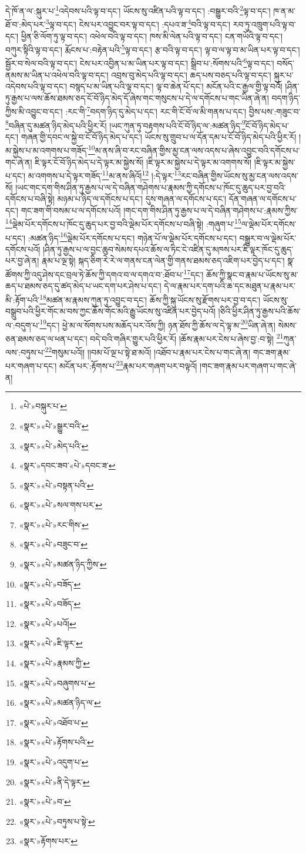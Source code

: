 དེ་ཁོ་ན་ལ་:སྐུར་པ་\footnote{«པེ་»བསྐུར་པ་}འདེབས་པའི་ལྟ་བ་དང་། ཡོངས་སུ་འཛིན་པའི་ལྟ་བ་དང་། :བསྒྱུར་བའི་\footnote{«སྣར་»«པེ་»སྒྱུར་བའི་}ལྟ་བ་དང་། ཁ་ན་མ་ཐོ་བ་:མེད་པར་\footnote{«སྣར་»«པེ་»མེད་པའི་}ལྟ་བ་དང་། ངེས་པར་འབྱུང་བར་ལྟ་བ་དང་། :དཔའ་ཟ་\footnote{«སྣར་»དབང་ཟབ་«པེ་»དབང་ཟ་}བའི་ལྟ་བ་དང་། རབ་ཏུ་འཁྲུག་པའི་ལྟ་བ་དང་། ཕྱིན་ཅི་ལོག་ཏུ་ལྟ་བ་དང་། འཕེལ་བའི་ལྟ་བ་དང་། ཁས་མི་ལེན་པའི་ལྟ་བ་དང་། ངན་གཡོའི་ལྟ་བ་དང་། བཀུར་སྟིའི་ལྟ་བ་དང་། རྨོངས་པ་:བརྟེན་པའི་\footnote{«སྣར་»«པེ་»བསྟན་པའི་}ལྟ་བ་དང་། རྩ་བའི་ལྟ་བ་དང་། ལྟ་བ་ལ་ལྟ་བ་མ་ཡིན་པར་ལྟ་བ་དང་། སྦྱོར་བ་སེལ་བའི་ལྟ་བ་དང་། ངེས་པར་འབྱིན་པ་མ་ཡིན་པར་ལྟ་བ་དང་། སྒྲིབ་པ་:སོགས་པའི་\footnote{«སྣར་»«པེ་»སལ་གས་པར་}ལྟ་བ་དང་། བསོད་ནམས་མ་ཡིན་པ་འཕེལ་བའི་ལྟ་བ་དང་། འབྲས་བུ་མེད་པའི་ལྟ་བ་དང་། ཆད་པས་བཅད་པའི་ལྟ་བ་དང་། སྐུར་པ་འདེབས་པའི་ལྟ་བ་དང་། བསྙད་པ་མ་ཡིན་པའི་ལྟ་བ་དང་། ལྟ་བ་ཆེན་པོ་དང་། མངོན་པའི་ང་རྒྱལ་གྱི་ལྟ་བའོ། །ཤིན་ཏུ་རྒྱས་པ་ལས་ཆོས་ཐམས་ཅད་ངོ་བོ་ཉིད་མེད་དོ་ཞེས་གང་གསུངས་པ་དེ་ལ་དགོངས་པ་གང་ཡིན་ཞེ་ན། བདག་ཉིད་ཀྱིས་མི་འབྱུང་བ་དང་། :རང་གི་\footnote{«སྣར་»«པེ་»རང་གིས་}བདག་ཉིད་དུ་མེད་པ་དང་། རང་གི་ངོ་བོ་ལ་མི་གནས་པ་དང་། བྱིས་པས་:གཟུང་བ་\footnote{«སྣར་»«པེ་»བཟུང་བ་}བཞིན་དུ་མཚན་ཉིད་མེད་པའི་ཕྱིར་རོ། །ཡང་ཀུན་ཏུ་བརྟགས་པའི་ངོ་བོ་ཉིད་ལ་:མཚན་ཉིད་\footnote{«སྣར་»«པེ་»མཚན་ཉིད་ཀྱིས་}ངོ་བོ་ཉིད་མེད་པ་དང་། གཞན་གྱི་དབང་ལ་སྐྱེ་བ་ངོ་བོ་ཉིད་མེད་པ་དང་། ཡོངས་སུ་གྲུབ་པ་ལ་དོན་དམ་པ་ངོ་བོ་ཉིད་མེད་པའི་ཕྱིར་རོ། །མ་སྐྱེས་པ་མ་འགགས་པ་གཟོད་\footnote{«སྣར་»«པེ་»བཟོད་}མ་ནས་ཞི་བ་རང་བཞིན་གྱིས་མྱ་ངན་ལས་འདས་པ་ཞེས་འབྱུང་བའི་དགོངས་པ་གང་ཞེ་ན། ཇི་ལྟར་ངོ་བོ་ཉིད་མེད་པ་དེ་ལྟར་མ་སྐྱེས་སོ། །ཇི་ལྟར་མ་སྐྱེས་པ་དེ་ལྟར་མ་འགགས་སོ། །ཇི་ལྟར་མ་སྐྱེས་པ་དང་། མ་འགགས་པ་དེ་ལྟར་གཟོད་\footnote{«སྣར་»«པེ་»བཟོད་}མ་ནས་ཞིའོ།\footnote{«སྣར་»«པེ་»པའོ།} །:དེ་ལྟར་\footnote{«སྣར་»«པེ་»ཇི་ལྟར་}རང་བཞིན་གྱིས་ཡོངས་སུ་མྱ་ངན་ལས་འདས་སོ། །ཡང་གང་དག་གིས་ཤིན་ཏུ་རྒྱས་པ་ལ་དེ་བཞིན་གཤེགས་པ་རྣམས་ཀྱི་དགོངས་པ་ཁོང་དུ་ཆུད་པར་བྱ་བའི་དགོངས་པ་བཞི་སྟེ། མཉམ་པ་ཉིད་ལ་དགོངས་པ་དང་། དུས་གཞན་ལ་དགོངས་པ་དང་། དོན་གཞན་ལ་དགོངས་པ་དང་། གང་ཟག་གི་བསམ་པ་ལ་དགོངས་པའོ། །གང་དག་གིས་ཤིན་ཏུ་རྒྱས་པ་ལ་དེ་བཞིན་གཤེགས་པ་:རྣམས་ཀྱིས་\footnote{«སྣར་»«པེ་»རྣམས་ཀྱི་}ལྡེམ་པོར་དགོངས་པ་ཁོང་དུ་ཆུད་པར་བྱ་བའི་ལྡེམ་པོར་དགོངས་པ་བཞི་སྟེ། :གཞུག་པ་\footnote{«སྣར་»«པེ་»བཞུགས་པ་}ལ་ལྡེམ་པོར་དགོངས་པ་དང་། :མཚན་ཉིད་\footnote{«སྣར་»«པེ་»མཚན་ཉིད་ལ་}ལྡེམ་པོར་དགོངས་པ་དང་། གཉེན་པོ་ལ་ལྡེམ་པོར་དགོངས་པ་དང་། བསྒྱུར་བ་ལ་ལྡེམ་པོར་དགོངས་པའོ། །ཤིན་ཏུ་རྒྱས་པ་ལ་བྱང་ཆུབ་སེམས་དཔའ་ཆོས་ལ་ཏིང་ངེ་འཛིན་དུ་མཁས་པར་ཇི་ལྟར་ཁོང་དུ་ཆུད་པར་བྱ་ཞེ་ན། རྣམ་པ་ལྔ་སྟེ། སྐད་ཅིག་རེ་རེ་ལ་གནས་ངན་ལེན་གྱི་གནས་ཐམས་ཅད་འཇིག་པར་བྱེད་པ་དང་། སྣ་ཚོགས་ཀྱི་འདུ་ཤེས་དང་བྲལ་ཏེ་ཆོས་ཀྱི་དགའ་བ་ལ་དགའ་བ་:ཐོབ་པ་\footnote{«སྣར་»«པེ་»འཐོབ་པ་}དང་། ཆོས་ཀྱི་སྣང་བ་རྣམ་པ་ཡོངས་སུ་མ་ཆད་པ་ཐམས་ཅད་དུ་ཚད་མེད་པ་ཡང་དག་པར་ཤེས་པ་དང་། དེ་ལ་རྣམ་པར་དག་པའི་ཆ་དང་མཐུན་པ་རྣམ་པར་མི་:རྟོག་པའི་\footnote{«སྣར་»«པེ་»རྟོགས་པའི་}མཚན་མ་རྣམས་ཀུན་ཏུ་འབྱུང་བ་དང་། ཆོས་ཀྱི་སྐུ་ཡོངས་སུ་རྫོགས་པར་བྱ་བ་དང་། ཡོངས་སུ་བསྒྲུབ་པའི་ཕྱིར་གོང་མ་བས་ཀྱང་ཆོས་གོང་མའི་རྒྱུ་ཡོངས་སུ་འཛིན་པར་བྱེད་པའོ། །ཅིའི་ཕྱིར་ཤིན་ཏུ་རྒྱས་པའི་ཆོས་ལ་:བདུག་པ་\footnote{«སྣར་»«པེ་»འདུག་པ་}དང་། ཕྱེ་མ་ལ་སོགས་པས་མཆོད་པར་འོས་ཀྱི། ཉན་ཐོས་ཀྱི་ཆོས་ལ་དེ་ལྟ་མ་\footnote{«སྣར་»«པེ་»ནི་དེ་ལྟར་}ཡིན་ཞེ་ན། སེམས་ཅན་ཐམས་ཅད་ལ་ཕན་པ་དང་། བདེ་བའི་གཞིར་གྱུར་པའི་ཕྱིར་རོ། །ཆོས་རྣམ་པར་ངེས་པ་ཞེས་བྱ་:བ་སྟེ། \footnote{«སྣར་»«པེ་»བ་}ཀུན་ལས་:བཏུས་པ་\footnote{«སྣར་»«པེ་»བཏུས་པ་སྟེ་}གསུམ་པའོ།། །།བམ་པོ་ལྔ་པ་སྟེ་ཐ་མའོ། །འཐོབ་པ་རྣམ་པར་ངེས་པ་གང་ཞེ་ན། གང་ཟག་རྣམ་པར་གཞག་པ་དང་། མངོན་པར་:རྟོགས་པ་\footnote{«སྣར་»རྟོགས་པར་}རྣམ་པར་གཞག་པར་བལྟའོ། །གང་ཟག་རྣམ་པར་གཞག་པ་གང་ཞེ་ན། 
